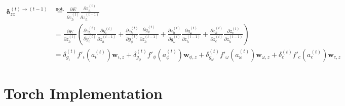 \documentclass[11pt]{article}
\begin{document}
\begin{equation}
\begin{split}
    \boldsymbol{\delta}_{zz}^{(t)\rightarrow(t-1)} &\overset{\text{not.}}{=} \displaystyle\frac{\partial E}{\partial z_h^{(t)}}  \displaystyle\frac{\partial z_h^{(t)}}{\partial z_h^{(t-1)}} \\
    &= \displaystyle\frac{\partial E}{\partial z_h^{(t)}} \left(
            \displaystyle\frac{\partial z_h^{(t)}}{\partial g_{\iota}^{(t)}} \displaystyle\frac{\partial g_{\iota}^{(t)}}{\partial z_h^{(t-1)}} +
            \displaystyle\frac{\partial z_h^{(t)}}{\partial g_{\phi}^{(t)}} \displaystyle\frac{\partial g_{\phi}^{(t)}}{\partial z_h^{(t-1)}} +
            \displaystyle\frac{\partial z_h^{(t)}}{\partial g_{\omega}^{(t)}} \displaystyle\frac{\partial g_{\omega}^{(t)}}{\partial z_h^{(t-1)}} +
            \displaystyle\frac{\partial z_h^{(t)}}{\partial z_{c}^{(t)}} \displaystyle\frac{\partial z_{c}^{(t)}}{\partial z_h^{(t-1)}} \right)\\
            &= \delta_{g_{\iota}}^{(t)} f'_{\iota}\left(a_{\iota}^{(t)}\right) \mathbf{w}_{\iota, z} +
               \delta_{g_{\phi}}^{(t)} f'_{\phi}\left(a_{\phi}^{(t)}\right) \mathbf{w}_{\phi, z} +
               \delta_{g_{\omega}}^{(t)} f'_{\omega}\left(a_{\omega}^{(t)}\right) \mathbf{w}_{\omega, z} +
               \delta_{c}^{(t)} f'_{c}\left(a_{c}^{(t)}\right) \mathbf{w}_{c, z}
\end{split}    
\end{equation}

\section{Torch Implementation}
\label{sec:torch}

\appendix

\printbibliography
\end{document}

